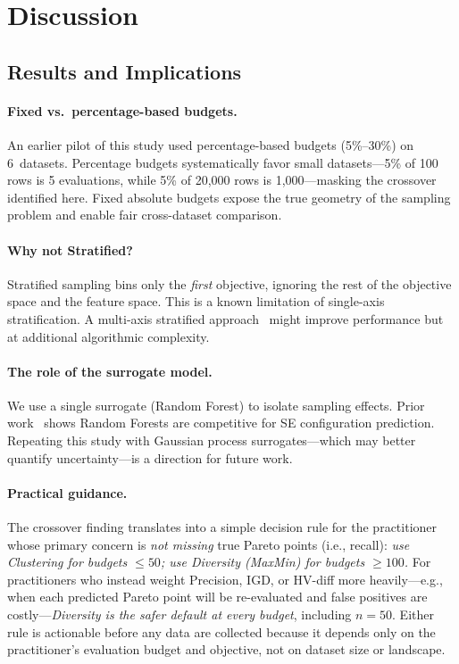 \documentclass[sigconf,nonacm]{acmart}
\begin{document}
\section{Discussion}
\label{sec:discussion}

\subsection{Results and Implications}
\label{sec:implications}

\paragraph{Fixed vs.\ percentage-based budgets.}
An earlier pilot of this study used percentage-based budgets (5\%--30\%) on
6~datasets.
Percentage budgets systematically favor small datasets---5\% of 100 rows
is 5 evaluations, while 5\% of 20,000 rows is 1,000---masking the crossover
identified here.
Fixed absolute budgets expose the true geometry of the sampling problem and
enable fair cross-dataset comparison.

\paragraph{Why not Stratified?}
Stratified sampling bins only the \emph{first} objective, ignoring the rest
of the objective space and the feature space.
This is a known limitation of single-axis stratification.
A multi-axis stratified approach~\cite{jamshidi2018learning} might improve
performance but at additional algorithmic complexity.

\paragraph{The role of the surrogate model.}
We use a single surrogate (Random Forest) to isolate sampling effects.
Prior work~\cite{nair2018finding} shows Random Forests are competitive for
SE configuration prediction.
Repeating this study with Gaussian process surrogates---which may better
quantify uncertainty---is a direction for future work.

\paragraph{Practical guidance.}
The crossover finding translates into a simple decision rule for the
practitioner whose primary concern is \emph{not missing} true Pareto points
(i.e., recall):
\emph{use Clustering for budgets $\leq 50$; use Diversity (MaxMin) for
budgets $\geq 100$.}
For practitioners who instead weight Precision, IGD, or HV-diff more
heavily---e.g., when each predicted Pareto point will be re-evaluated and
false positives are costly---\emph{Diversity is the safer default at every
budget}, including $n=50$.
Either rule is actionable before any data are collected because it depends
only on the practitioner's evaluation budget and objective, not on dataset
size or landscape.
\end{document}
